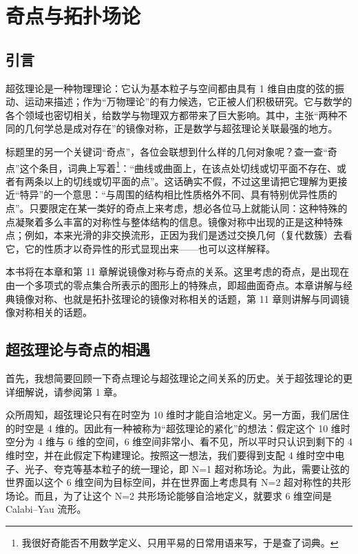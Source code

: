 \renewcommand{\thesection}{\arabic{section}}
\chapter{奇点与拓扑场论}

\section{引言}

超弦理论是一种物理理论：它认为基本粒子与空间都由具有 1 维自由度的弦的振动、运动来描述；作为“万物理论”的有力候选，它正被人们积极研究。它与数学的各个领域也密切相关，给数学与物理双方都带来了巨大影响。其中，主张“两种不同的几何学总是成对存在”的镜像对称，正是数学与超弦理论关联最强的地方。

标题里的另一个关键词“奇点”，各位会联想到什么样的几何对象呢？查一查“奇点”这个条目，词典上写着\footnote{我很好奇能否不用数学定义、只用平易的日常用语来写，于是查了词典。}：“曲线或曲面上，在该点处切线或切平面不存在、或者有两条以上的切线或切平面的点”。这话确实不假，不过这里请把它理解为更接近“特异”的一个意思：“与周围的结构相比性质格外不同、具有特别优异性质的点”。只要限定在某一类好的奇点上来考虑，想必各位马上就能认同：这种特殊的点凝聚着多么丰富的对称性与整体结构的信息。镜像对称中出现的正是这种特殊点；例如，本来光滑的非交换流形，正因为我们是透过交换几何（复代数簇）去看它，它的性质才以奇异性的形式显现出来——也可以这样解释。%

本书将在本章和第 11 章解说镜像对称与奇点的关系。这里考虑的奇点，是出现在由一个多项式的零点集合所表示的图形上的特殊点，即超曲面奇点。本章讲解与经典镜像对称、也就是拓扑弦理论的镜像对称相关的话题，第 11 章则讲解与同调镜像对称相关的话题。

\section{超弦理论与奇点的相遇}

首先，我想简要回顾一下奇点理论与超弦理论之间关系的历史。关于超弦理论的更详细解说，请参阅第 1 章。

众所周知，超弦理论只有在时空为 10 维时才能自洽地定义。另一方面，我们居住的时空是 4 维的。因此有一种被称为“超弦理论的紧化”的想法：假定这个 10 维时空分为 4 维与 6 维的空间，6 维空间非常小、看不见，所以平时只认识到剩下的 4 维时空，并在此假定下构建理论。按照这一想法，我们要得到支配 4 维时空中电子、光子、夸克等基本粒子的统一理论，即 N=1 超对称场论。为此，需要让弦的世界面以这个 6 维空间为目标空间，并在世界面上考虑具有 N=2 超对称性的共形场论。而且，为了让这个 N=2 共形场论能够自洽地定义，就要求 6 维空间是 Calabi--Yau 流形。


